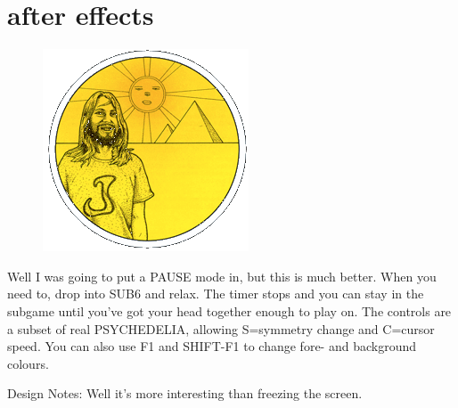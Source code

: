 \chapter{after effects} 
\label{sec:patterns}
\rhead[]{\leftmark}
\lstset{style=6502Style}
\lstset{ 
   aboveskip=5pt,
   belowskip=0pt,
}

\begin{definition}
\setlength{\intextsep}{0pt}%
\setlength{\columnsep}{3pt}%
\begin{figure}
\includegraphics[width=\linewidth]{src/callout/psych.png} 
\end{figure}
\small
Well I was going to put a PAUSE mode in, but this is much better. When you need to, drop into SUB6 and relax. The timer stops and you can stay in the subgame until you've got your head together enough to play on. The controls are a subset of real PSYCHEDELIA, allowing S=symmetry change and C=cursor speed. You can also use F1 and SHIFT-F1 to change fore- and background colours.

Design Notes: Well it's more interesting than freezing the screen.
\end{definition}



